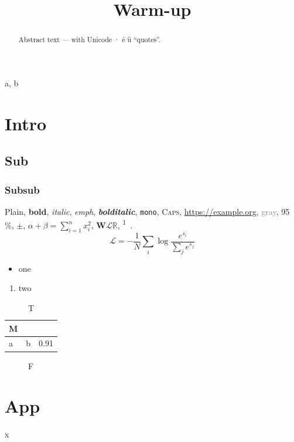 \documentclass[conference]{IEEEtran}
\begin{document}
\title{Warm-up}
\author{\and{}}
\maketitle
\begin{abstract}Abstract text — with Unicode · é ü “quotes”.\end{abstract}
\begin{IEEEkeywords}a, b\end{IEEEkeywords}
\section{Intro}\subsection{Sub}\subsubsection{Subsub}
Plain, \textbf{bold}, \textit{italic}, \emph{emph}, \textbf{\textit{bolditalic}}, \texttt{mono}, \textsc{Caps},
\url{https://example.org}, \textcolor{gray}{gray}, 95\,\%, $\pm$, $\alpha+\beta=\sum_{i=1}^{n} x_i^2$,
$\mathbf{W}\mathcal{L}\mathbb{R}$, \textsuperscript{1}~\cite{a,b}.
\begin{equation}\mathcal{L}=-\frac{1}{N}\sum_{i}\log\frac{e^{s_i}}{\sum_j e^{s_j}}\end{equation}
\begin{itemize}\item one\end{itemize}\begin{enumerate}\item two\end{enumerate}
\begin{table}[t]\centering\caption{T}\small
\begin{tabularx}{\textwidth}{l>{\raggedright\arraybackslash}X r}\toprule
\multirow{2}{*}{M} & \multicolumn{2}{c}{H}\\\midrule a & b & 0.91\\\bottomrule\end{tabularx}\end{table}
\begin{figure}[t]\centering{}\caption{F}\end{figure}
\appendices\section{App}x


\end{document}
